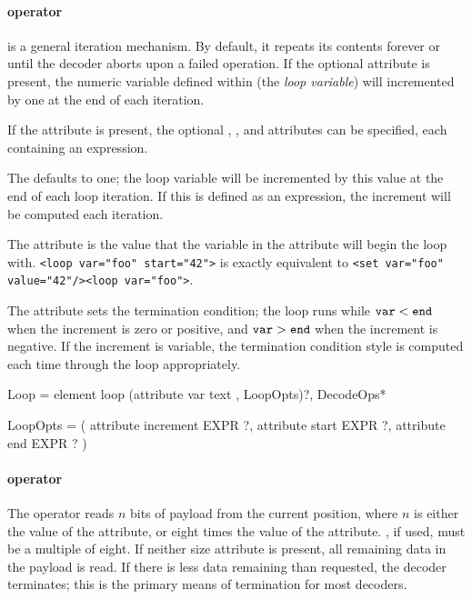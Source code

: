 \documentclass{article}
\begin{document}
\paragraph{ operator}

 is a general iteration mechanism.  By default, it repeats
its contents forever or until the decoder aborts upon a failed
 operation.  If the optional  attribute is present,
the numeric variable defined within (the \emph{loop variable}) will
incremented by one at the end of each iteration.

If the  attribute is present, the optional ,
, and  attributes can be specified, each
containing an expression.

The  defaults to one; the loop variable will be
incremented by this value at the end of each loop iteration.  If this
is defined as an expression, the increment will be computed each
iteration.

The  attribute is the value that the variable in the
 attribute will begin the loop with.
\lstinline[language=siexml]!<loop var="foo" start="42">!
is exactly equivalent to
\lstinline[language=siexml]!<set var="foo" value="42"/><loop var="foo">!.

The  attribute sets the termination condition; the loop runs
while $\texttt{var} < \texttt{end}$ when the increment is zero or positive,
and $\texttt{var} > \texttt{end}$ when the increment is negative.  If the
increment is variable, the termination condition style is computed
each time through the loop appropriately.

\begin{grammar}
Loop = element loop {
  (attribute var { text }, LoopOpts)?,
  DecodeOps*
}
\end{grammar}
\begin{grammar}
LoopOpts = (
  attribute increment { EXPR }?,
  attribute start { EXPR }?,
  attribute end { EXPR }?
)
\end{grammar}

\paragraph{ operator}

The  operator reads $n$ bits of payload from the current
position, where $n$ is either the value of the  attribute,
or eight times the value of the  attribute.  ,
if used, must be a multiple of eight.  If neither size attribute is
present, all remaining data in the payload is read.  If there is less
data remaining than requested, the decoder terminates; this is the
primary means of termination for most decoders.
\end{document}

